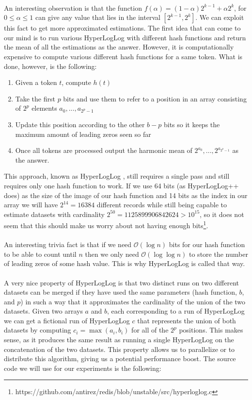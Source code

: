 \\
An interesting observation is that the function $f(\alpha) = (1 - \alpha)2^{k - 1} + \alpha2^{k}$, for $0 \leq \alpha \leq 1$ can give any value that lies in the interval $[2^{k - 1}, 2^{k}]$. We can exploit this fact to get more approximated estimations. The first idea that can come to our mind is to run various HyperLogLog with different hash functions and return the mean of all the estimations as the answer. However, it is computationally expensive to compute various different hash functions for a same token. What is done, however, is the following: 
\begin{enumerate}
\item Given a token $t$, compute $h(t)$
\item Take the first $p$ bits and use them to refer to a position in an array consisting of $2^p$ elements $a_{0}, ..., a_{2^p - 1}$
\item Update this position according to the other $b - p$ bits so it keeps the maximum amount of leading zeros seen so far
\item Once all tokens are processed output the harmonic mean of $2^{a_{0}}, ..., 2^{a_{2^p - 1}}$ as the answer.
\end{enumerate}
This approach, known as HyperLogLog \cite{Flajolet07hyperloglog:the}, still requires a single pass and still requires only one hash function to work. If we use 64 bits (as HyperLogLog++ \cite{40671} does) as the size of the image of our hash function and 14 bits as the index in our array we will have $2^{14} = 16384$ different records while still being capable to estimate datasets with cardinality $2^{50} = 1125899906842624 > 10^{15}$, so it does not seem that this should make us worry about not having enough bits\footnote{https://github.com/antirez/redis/blob/unstable/src/hyperloglog.c}.\\
\\
An interesting trivia fact is that if we need $\mathcal{O}(\log n)$ bits for our hash function to be able to count until $n$ then we only need $\mathcal{O}(\log \log n)$ to store the number of leading zeros of some hash value. This is why HyperLogLog is called that way.\\
\\
A very nice property of HyperLogLog is that two distinct runs on two different datasets can be merged if they have used the same parameters (hash function, $b$, and $p$) in such a way that it approximates the cardinality of the union of the two datasets. Given two arrays $a$ and $b$, each corresponding to a run of HyperLogLog we can get a fictional run of HyperLogLog $c$ that represents the union of both datasets by computing $c_{i} =\max(a_{i}, b_{i})$ for all of the $2^{p}$ positions. This makes sense, as it produces the same result as running a single HyperLogLog on the concatenation of the two datasets. This property allows us to parallelize or to distribute this algorithm, giving us a potential performance boost. The source code we will use for our experiments is the following:
